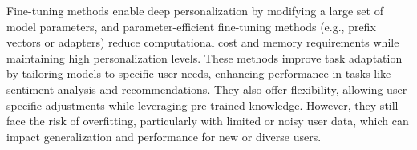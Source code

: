 Fine-tuning methods enable deep personalization by modifying a large set of model parameters, and parameter-efficient fine-tuning methods (e.g., prefix vectors or adapters) reduce computational cost and memory requirements while maintaining high personalization levels. These methods improve task adaptation by tailoring models to specific user needs, enhancing performance in tasks like sentiment analysis and recommendations. They also offer flexibility, allowing user-specific adjustments while leveraging pre-trained knowledge. However, they still face the risk of overfitting, particularly with limited or noisy user data, which can impact generalization and performance for new or diverse users.